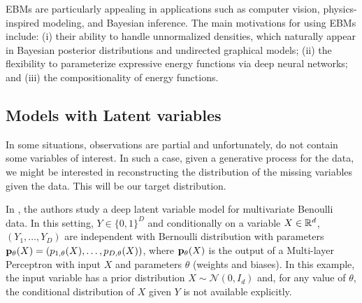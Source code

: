 \documentclass[english,graybox,envcountchap,envcountsame,sectrefs,shortlabels]{svmono}
\theoremstyle{style}
\begin{document}
EBMs are particularly appealing in applications such as computer vision, physics-inspired modeling, and Bayesian inference.  The main motivations for using EBMs include: (i) their ability to handle unnormalized densities, which naturally appear in Bayesian posterior distributions and undirected graphical models; (ii) the flexibility to parameterize expressive energy functions via deep neural networks; and (iii) the compositionality of energy functions.  


%


\subsection{Models with Latent variables}
In some situations, observations are partial and unfortunately, do not contain some variables of interest. In such a case, given a generative process for the data, we might be interested in reconstructing the distribution of the missing variables given the data. This will be our target distribution. 

\begin{example}
In \cite{kingma2013auto}, the authors study a deep latent variable model for multivariate Benoulli data. In this setting, $Y\in\{0,1\}^D$ and conditionally on a variable $X\in\mathbb{R}^d$, $(Y_1,\ldots,Y_D)$ are independent with Bernoulli distribution with parameters ${\bf p}_\theta(X) = (p_{1,\theta}(X),\ldots, p_{D,\theta}(X))$, where ${\bf p}_\theta(X) $ is the output of a Multi-layer Perceptron with input $X$ and parameters $\theta$ (weights and biases). In this example, the input variable has a prior distribution $X\sim \mathcal{N}(0,I_d)$ and, for any value of $\theta$, the conditional distribution of $X$ given $Y$ is not available explicitly.
\end{example}
\end{document}
